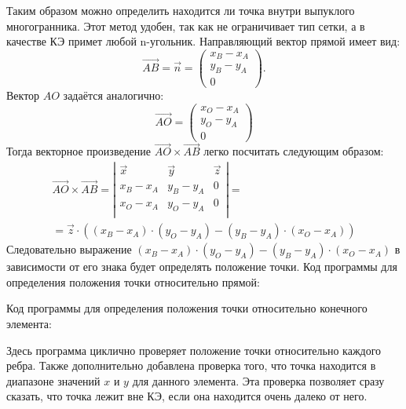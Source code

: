 Таким образом можно определить находится ли точка внутри выпуклого многогранника. Этот метод удобен, так как не ограничивает тип сетки, а в качестве КЭ примет любой n-угольник.
Направляющий вектор прямой имеет вид:
\begin{equation*}
	\vec{AB} = \vec n = \begin{pmatrix}
		x_B - x_A\\
		y_B - y_A\\
		0
	\end{pmatrix}.
\end{equation*}
Вектор $AO$ задаётся аналогично:
\begin{equation*}
	\vec {AO} = \begin{pmatrix}
		x_O - x_A\\
		y_O - y_A\\
		0
	\end{pmatrix}
\end{equation*}
Тогда векторное произведение $\vec{AO}\times\vec{AB}$ легко посчитать следующим образом:
\begin{multline*}
	\vec{AO}\times\vec{AB} = \left|\begin{array}{ccc}
		\vec{x} & \vec{y} & \vec{z} \\
		x_B - x_A & y_B - y_A & 0 \\
		x_O - x_A & y_O - y_A & 0 \\
	\end{array}\right| =\\= \vec{z}\cdot\left(\left(x_B - x_A\right)\cdot\left(y_O - y_A\right) - \left(y_B - y_A\right)\cdot\left(x_O - x_A\right)\right)
\end{multline*}
Следовательно выражение $\left(x_B - x_A\right)\cdot\left(y_O - y_A\right) - \left(y_B - y_A\right)\cdot\left(x_O - x_A\right)$ в зависимости от его знака будет определять положение точки. Код программы для определения положения точки относительно прямой:


Код программы для определения положения точки относительно конечного элемента:

Здесь программа циклично проверяет положение точки относительно каждого ребра. Также дополнительно добавлена проверка того, что точка находится в диапазоне значений $x$ и $y$ для данного элемента. Эта проверка позволяет сразу сказать, что точка лежит вне КЭ, если она находится очень далеко от него.